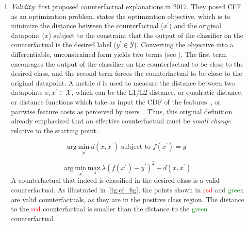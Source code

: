 \begin{enumerate}[leftmargin=*]
    \item \textit{Validity}: \citet{wachter_counterfactual_2017} first proposed counterfactual explanations in 2017. They posed CFE as an optimization problem. 
     states the optimization objective, which is to minimize the distance between the counterfactual ($x^{\prime}$) and the original datapoint ($x$) subject to the constraint that the output of the classifier on the counterfactual is the desired label ($y^{\prime} \in \mathcal{Y}$). Converting the objective into a differentiable, unconstrained form yields two terms (see ). 
    The first term encourages the output of the classifier on the counterfactual to be close to the desired class, and the second term forces the counterfactual to be close to the original datapoint. A metric $d$ is used to measure the distance between two datapoints $x, x^{\prime} \in \mathcal{X}$, which can be the L1/L2 distance, or quadratic distance, or distance functions which take as input the CDF of the features~\citep{Ustun19:Actionable}, or pairwise feature costs as perceived by users~\citep{hima-beyond-recourse-globalcfe}. Thus, this original definition already emphasized that an effective counterfactual must be \emph{small change} relative to the starting point. 
    
    \begin{equation}
        {\mathrm{arg \ }}\underset{x^{\prime}}{\mathrm{min \ }} d(x, x^{\prime}) \text{ subject to } f(x^{\prime}) = y^{\prime}
        \label{eq:cfe1_primal}
    \end{equation}
    
    \begin{equation}
        {\mathrm{arg \ }}\underset{x^{\prime}}{\mathrm{min \ }}\underset{\lambda}{\mathrm{max \ }} \lambda(f(x^{\prime}) - y^{\prime})^2 + d(x, x^{\prime})
        \label{eq:cfe1}
    \end{equation}
    A counterfactual that indeed is classified in the desired class is a valid counterfactual. As illustrated in \cref{fig:cf_fig}, the points shown in \textcolor{red}{red} and \textcolor{green}{green} are valid counterfactuals, as they are in the positive class region. The distance to the \textcolor{red}{red} counterfactual is smaller than the distance to the \textcolor{green}{green} counterfactual. 
    

\end{enumerate}
